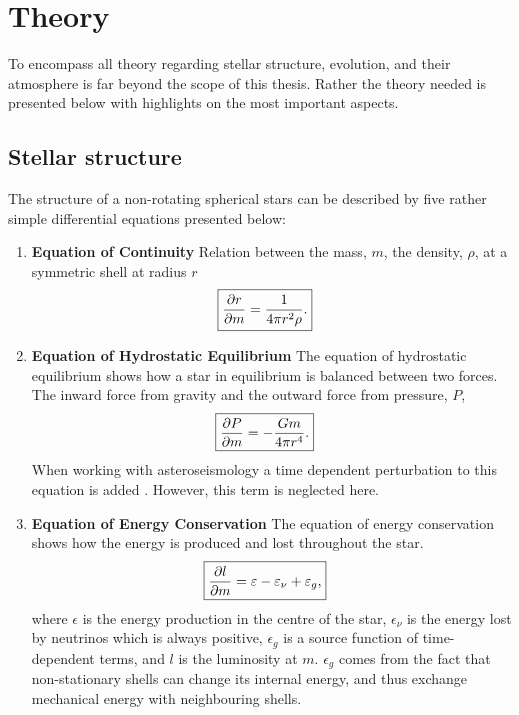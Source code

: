 \chapter{Theory}

To encompass all theory regarding stellar structure, evolution, and their
atmosphere is far beyond the scope of this thesis. Rather the theory needed is
presented below with highlights on the most important aspects.

\section{Stellar structure}

The structure of a non-rotating spherical stars can be described by five rather
simple differential equations \citep[see e.g.][]{kippenhahn} presented below:
\begin{enumerate}
    \item \textbf{Equation of Continuity}
        \nicebreak
        Relation between the mass, $m$, the density, $\rho$, at a symmetric
        shell at radius $r$
        \begin{align}
            \Aboxed{\pd{r}{m} &= \frac{1}{4\pi r^2\rho}.}
        \end{align}

    \item \textbf{Equation of Hydrostatic Equilibrium}
        \nicebreak
        The equation of hydrostatic equilibrium shows how a star in equilibrium
        is balanced between two forces. The inward force from gravity and the
        outward force from pressure, $P$,
        \begin{align}
            \Aboxed{\pd{P}{m} &= -\frac{Gm}{4\pi r^4}.}
        \end{align}
        When working with asteroseismology a time dependent perturbation to this
        equation is added \citep[see e.g.][for a thorough discussion]{Aerts2010}.
        However, this term is neglected here.


    \item \textbf{Equation of Energy Conservation}
        \nicebreak
        The equation of energy conservation shows how the energy is produced and
        lost throughout the star.
        \begin{align}
            \Aboxed{\pd{l}{m} = \epsilon - \epsilon_\nu + \epsilon_g,}
        \end{align}
        where $\epsilon$ is the energy production in the centre of the star,
        $\epsilon_\nu$ is the energy lost by neutrinos which is always
        positive, $\epsilon_g$ is a source function of time-dependent terms,
        and $l$ is the luminosity at $m$. $\epsilon_g$ comes from the fact that
        non-stationary shells can change its internal energy, and thus exchange
        mechanical energy with neighbouring shells.


\end{enumerate}

